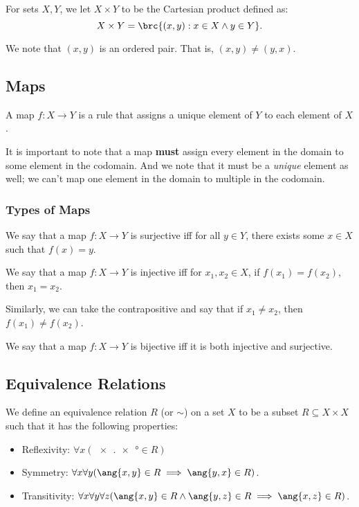\documentclass[openany]{book}
\begin{document}
\begin{defn}
	For sets $X, Y$, we let $X \times Y$ to be the Cartesian product defined as:
	\begin{equation*}
		X \times Y = \brc{(x, y) : x \in X \land y \in Y}.
	\end{equation*}
\end{defn}

We note that $(x, y)$ is an ordered pair. That is, $(x, y) \neq (y, x)$.

\subsection{Maps}
\begin{defn}[Map]
	A map $f: X \rightarrow Y$ is a rule that assigns a unique element of $Y$ to each element of $X$.
\end{defn}
\begin{warn}
	It is important to note that a map \textbf{must} assign every element in the domain to some element in the codomain. And we note that it must be a \textit{unique} element as well; we can't map one element in the domain to multiple in the codomain.
\end{warn}
\subsubsection{Types of Maps}
\begin{defn}[Surjectivity]
	We say that a map $f: X \rightarrow Y$ is surjective iff for all $y \in Y$, there exists some $x \in X$ such that $f(x) = y$.
\end{defn}

\begin{defn}[Injectivity]
	We say that a map $f : X \rightarrow Y$ is injective iff for $x_1, x_2 \in X$, if $f(x_1) = f(x_2)$, then $x_1 = x_2$.
	
	Similarly, we can take the contrapositive and say that if $x_1 \neq x_2$, then $f(x_1) \neq f(x_2)$.
\end{defn}

\begin{defn}[Bijectivity]
	We say that a map $f: X \rightarrow Y$ is bijective iff it is both injective and surjective.
\end{defn}

\subsection{Equivalence Relations}
\begin{defn}
	We define an equivalence relation $R$ (or $\sim$) on a set $X$ to be a subset $R \subseteq X \times X$ such that it has the following properties:
	\begin{itemize}
		\item Reflexivity: $\forall x (\ang{x, x} \in R)$
		\item Symmetry: $\forall x \forall y(\ang{x, y} \in R \implies \ang{y, x} \in R)$.
		\item Transitivity: $\forall x\forall y \forall z (\ang{x,y} \in R \land \ang{y, z} \in R \implies \ang{x, z} \in R)$.
	\end{itemize}
\end{defn}
\end{document}
